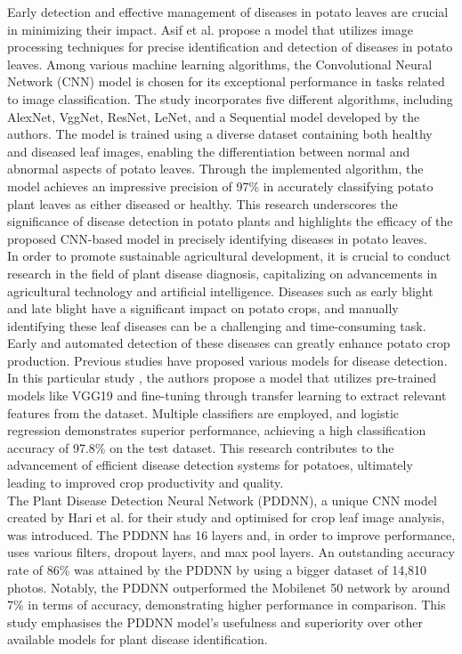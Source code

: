 \documentclass[conference]{IEEEtran}
\begin{document}
Early detection and effective management of diseases in potato leaves are crucial in minimizing their impact. Asif et al. \cite{9316021} propose a model that utilizes image processing techniques for precise identification and detection of diseases in potato leaves. Among various machine learning algorithms, the Convolutional Neural Network (CNN) model is chosen for its exceptional performance in tasks related to image classification. The study incorporates five different algorithms, including AlexNet, VggNet, ResNet, LeNet, and a Sequential model developed by the authors. The model is trained using a diverse dataset containing both healthy and diseased leaf images, enabling the differentiation between normal and abnormal aspects of potato leaves. Through the implemented algorithm, the model achieves an impressive precision of 97\% in accurately classifying potato plant leaves as either diseased or healthy. This research underscores the significance of disease detection in potato plants and highlights the efficacy of the proposed CNN-based model in precisely identifying diseases in potato leaves.\\


In order to promote sustainable agricultural development, it is crucial to conduct research in the field of plant disease diagnosis, capitalizing on advancements in agricultural technology and artificial intelligence. Diseases such as early blight and late blight have a significant impact on potato crops, and manually identifying these leaf diseases can be a challenging and time-consuming task. Early and automated detection of these diseases can greatly enhance potato crop production. Previous studies have proposed various models for disease detection. In this particular study \cite{9121067}, the authors propose a model that utilizes pre-trained models like VGG19 and fine-tuning through transfer learning to extract relevant features from the dataset. Multiple classifiers are employed, and logistic regression demonstrates superior performance, achieving a high classification accuracy of 97.8\% on the test dataset. This research contributes to the advancement of efficient disease detection systems for potatoes, ultimately leading to improved crop productivity and quality.\\

The Plant Disease Detection Neural Network (PDDNN), a unique CNN model created by Hari et al. \cite{8899748} for their study and optimised for crop leaf image analysis, was introduced. The PDDNN has 16 layers and, in order to improve performance, uses various filters, dropout layers, and max pool layers. An outstanding accuracy rate of 86\% was attained by the PDDNN by using a bigger dataset of 14,810 photos. Notably, the PDDNN outperformed the Mobilenet 50 network by around 7\% in terms of accuracy, demonstrating higher performance in comparison. This study emphasises the PDDNN model's usefulness and superiority over other available models for plant disease identification.\\
\end{document}
